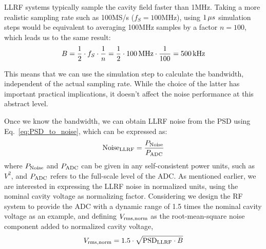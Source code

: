 \documentclass[a4paper,12pt]{article}
\begin{document}
LLRF systems typically sample the cavity field faster than 1\thinspace MHz. Taking a more realistic sampling rate such as 100\thinspace MS/s ($f_S=100$\thinspace MHz), using $1\thinspace\mu s$ simulation steps would be equivalent to averaging 100\thinspace MHz samples by a factor $n=100$, which leads us to the same result:
\begin{equation}
  \centering B = \frac{1}{2} \cdot f_S \cdot \frac{1}{n} = \frac{1}{2} \cdot 100\thinspace{\rm MHz} \cdot \frac{1}{100} = 500\thinspace{\rm kHz}
\end{equation}

\noindent This means that we can use the simulation step to calculate the bandwidth, independent of the actual sampling rate.  While the choice of the latter has important practical implications, it doesn't affect the noise performance at this abstract level.

Once we know the bandwidth, we can obtain LLRF noise from the PSD using Eq.~\eqref{eq:PSD_to_noise}, which can be expressed as:
\begin{equation}
  \centering {\rm Noise}_{\rm LLRF} = \frac{P_{\rm Noise}}{P_{\rm ADC}}
  \label{eq:dBc_def}
\end{equation}
where $P_{\rm Noise}$ and $P_{\rm ADC}$ can be given in any self-consistent power units, such as $V^2$,
and $P_{\rm ADC}$ refers to the full-scale level of the \hbox{ADC}.
As mentioned earlier, we are interested in expressing the LLRF noise in normalized units, using the nominal cavity voltage as normalizing factor. Considering we design the RF system to provide the ADC with a dynamic range of 1.5 times the nominal cavity voltage as an example, 
and defining $V_{\rm rms,norm}$ as the root-mean-square noise component added to
normalized cavity voltage,
\begin{equation}
  \centering V_{\rm rms,norm} = 1.5 \cdot \sqrt{{\rm PSD}_{\rm LLRF} \cdot B}
  \label{eq:v_noise_final}
\end{equation}
\end{document}
